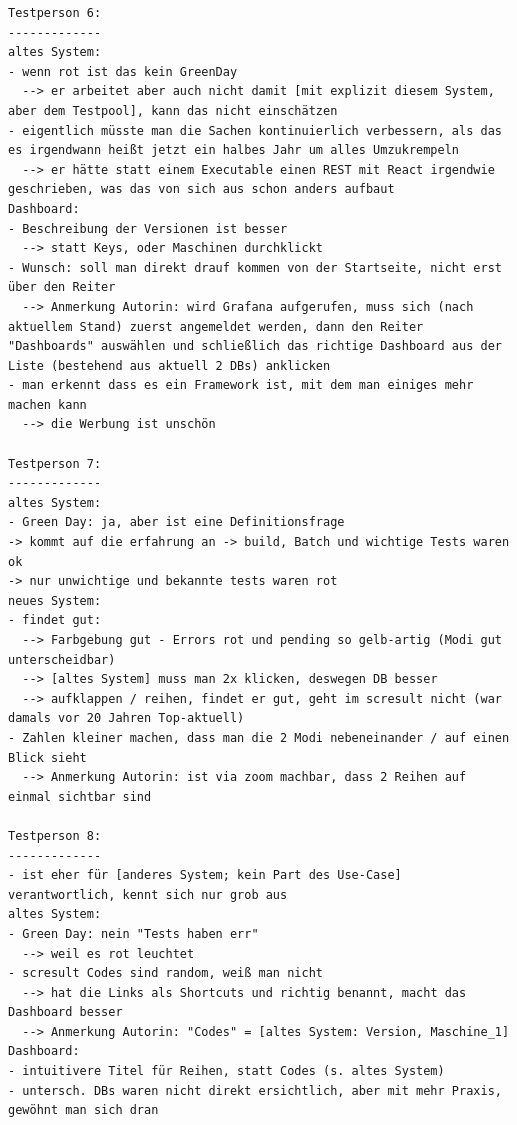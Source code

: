 \begin{lstlisting}[language={[LaTeX]TeX},inputencoding={utf8}]
Testperson 6:
-------------
altes System:
- wenn rot ist das kein GreenDay
  --> er arbeitet aber auch nicht damit [mit explizit diesem System, aber dem Testpool], kann das nicht einschätzen
- eigentlich müsste man die Sachen kontinuierlich verbessern, als das es irgendwann heißt jetzt ein halbes Jahr um alles Umzukrempeln
  --> er hätte statt einem Executable einen REST mit React irgendwie geschrieben, was das von sich aus schon anders aufbaut
Dashboard:
- Beschreibung der Versionen ist besser
  --> statt Keys, oder Maschinen durchklickt
- Wunsch: soll man direkt drauf kommen von der Startseite, nicht erst über den Reiter
  --> Anmerkung Autorin: wird Grafana aufgerufen, muss sich (nach aktuellem Stand) zuerst angemeldet werden, dann den Reiter "Dashboards" auswählen und schließlich das richtige Dashboard aus der Liste (bestehend aus aktuell 2 DBs) anklicken
- man erkennt dass es ein Framework ist, mit dem man einiges mehr machen kann
  --> die Werbung ist unschön

Testperson 7:
-------------
altes System:
- Green Day: ja, aber ist eine Definitionsfrage
-> kommt auf die erfahrung an -> build, Batch und wichtige Tests waren ok
-> nur unwichtige und bekannte tests waren rot
neues System:
- findet gut:
  --> Farbgebung gut - Errors rot und pending so gelb-artig (Modi gut unterscheidbar)
  --> [altes System] muss man 2x klicken, deswegen DB besser
  --> aufklappen / reihen, findet er gut, geht im scresult nicht (war damals vor 20 Jahren Top-aktuell)
- Zahlen kleiner machen, dass man die 2 Modi nebeneinander / auf einen Blick sieht
  --> Anmerkung Autorin: ist via zoom machbar, dass 2 Reihen auf einmal sichtbar sind

Testperson 8:
-------------
- ist eher für [anderes System; kein Part des Use-Case] verantwortlich, kennt sich nur grob aus
altes System:
- Green Day: nein "Tests haben err"
  --> weil es rot leuchtet
- scresult Codes sind random, weiß man nicht
  --> hat die Links als Shortcuts und richtig benannt, macht das Dashboard besser
  --> Anmerkung Autorin: "Codes" = [altes System: Version, Maschine_1]
Dashboard:
- intuitivere Titel für Reihen, statt Codes (s. altes System)
- untersch. DBs waren nicht direkt ersichtlich, aber mit mehr Praxis, gewöhnt man sich dran


\end{lstlisting}
